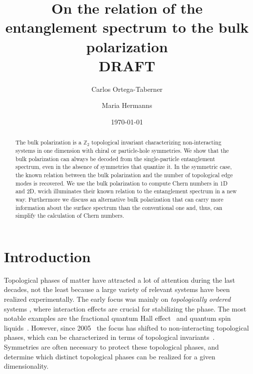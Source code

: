\documentclass[twocolumn,amsmath,longbibliography,amssymb,superscriptaddress]{revtex4-1}
\begin{document}
		
\title{On the relation of the entanglement spectrum to the bulk polarization \\ DRAFT}
\author{Carlos Ortega-Taberner}

\author{Maria Hermanns}
\date{\today}
\begin{abstract}
The bulk polarization is a $\mathbb{Z}_2$ topological invariant characterizing non-interacting systems in one dimension with chiral or particle-hole symmetries. We show that the bulk polarization can always be decoded from the single-particle entanglement spectrum, even in the absence of symmetries that quantize it. In the symmetric case, the known relation between the bulk polarization and the number of topological edge modes is recovered. We use the bulk polarization to compute Chern numbers in 1D and 2D, wcich illuminates their known relation to the entanglement spectrum  in a new way. Furthermore we discuss an alternative bulk polarization that can carry more information about the surface spectrum than the conventional one and, thus, can simplify the calculation of Chern numbers. 
\end{abstract}

\maketitle
	


\section{Introduction}
Topological phases of matter have attracted a lot of attention during the last decades, not the least because a large variety of relevant systems have been realized experimentally. 
The early focus was mainly on \emph{topologically ordered} systems \cite{wenbook}, where interaction effects are crucial for stabilizing the phase. 
The most notable examples are the fractional quantum Hall effect~\cite{Tsui1982} and quantum spin liquids~\cite{Balents2010spin}. 
However, since 2005~\cite{kane2005quantum, roy2009topological} the focus has shifted to non-interacting topological phases, which can be characterized in terms of topological invariants~\cite{ryu2010topological}. 
Symmetries are often necessary to protect these topological phases, and determine which distinct topological phases can be realized for a given dimensionality. 
\end{document}
